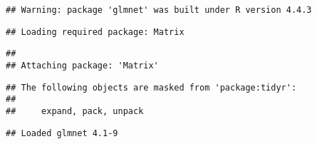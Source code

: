 \documentclass[
]{article}
\begin{document}
\begin{verbatim}
## Warning: package 'glmnet' was built under R version 4.4.3
\end{verbatim}

\begin{verbatim}
## Loading required package: Matrix
\end{verbatim}

\begin{verbatim}
## 
## Attaching package: 'Matrix'
\end{verbatim}

\begin{verbatim}
## The following objects are masked from 'package:tidyr':
## 
##     expand, pack, unpack
\end{verbatim}

\begin{verbatim}
## Loaded glmnet 4.1-9
\end{verbatim}
\end{document}
